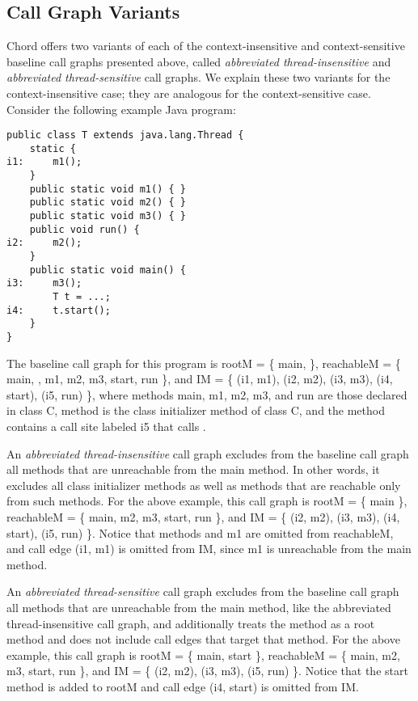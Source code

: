 \subsection{Call Graph Variants}

Chord offers two variants of each of the context-insensitive and
context-sensitive baseline call graphs presented above, called {\it abbreviated
thread-insensitive} and {\it abbreviated thread-sensitive} call graphs.  We
explain these two variants for the context-insensitive case; they are analogous
for the context-sensitive case.  Consider the following example Java program:

\begin{framed}
\begin{verbatim}
public class T extends java.lang.Thread {
    static {
i1:     m1();
    }
    public static void m1() { }
    public static void m2() { }
    public static void m3() { }
    public void run() {
i2:     m2();
    }
    public static void main() {
i3:     m3();
        T t = ...;
i4:     t.start();
    }
}
\end{verbatim}
\end{framed}

The baseline call graph for this program is 
rootM = \{ main,  \}, 
reachableM = \{ main, , m1, m2, m3, start, run \}, and
IM = \{ (i1, m1), (i2, m2), (i3, m3), (i4, start), (i5, run) \}, where methods
main, m1, m2, m3, and run are those declared in class C, method 
is the class initializer method of class C, and the
 method contains a call site labeled i5 that calls
.

An {\it abbreviated thread-insensitive} call graph excludes from the baseline call
graph all methods that are unreachable from the main method.  In other words, it
excludes all class initializer methods as well as methods that are reachable
only from such methods.
For the above example, this call graph is
rootM = \{ main \},
reachableM = \{ main, m2, m3, start, run \}, and
IM = \{ (i2, m2), (i3, m3), (i4, start), (i5, run) \}.  Notice that methods
 and m1 are omitted from reachableM, and call edge (i1, m1) is
omitted from IM, since m1 is unreachable from the main method.

An {\it abbreviated thread-sensitive} call graph excludes from the baseline call
graph all methods that are unreachable from the main method, like the
abbreviated thread-insensitive call graph, and additionally treats the
 method as a root method and does not include
call edges that target that method.
For the above example, this call graph is
rootM = \{ main, start \},
reachableM = \{ main, m2, m3, start, run \}, and
IM = \{ (i2, m2), (i3, m3), (i5, run) \}.  Notice that the start method is
added to rootM and call edge (i4, start) is omitted from IM.

